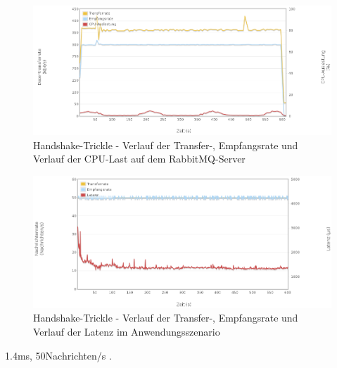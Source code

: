 \documentclass[	a4paper,
			11pt,
			titlepage,
			oneside,
			fleqn,
			listof=totoc,
			parskip,
			numbers=noenddot]{scrartcl}
\begin{document}
		\begin{figure}[!htb]
			\centering
			\includegraphics[width=\textwidth]{img/handshake/handshake_server2.png}
			\caption{Handshake-Trickle - Verlauf der Transfer-, Empfangsrate und Verlauf der CPU-Last auf dem RabbitMQ-Server}
			\label{fig:handshake-server2}
		\end{figure}
		
		\begin{figure}[!htb]
			\centering
			\includegraphics[width=\textwidth]{img/handshake/handshake_scenario.png}
			\caption{Handshake-Trickle - Verlauf der Transfer-, Empfangsrate und Verlauf der Latenz im Anwendungsszenario}
			\label{fig:handshake-scenario}
		\end{figure}
	
	
	\clearpage
		{%
		  \newline
		  \newline
		  \newline
		}{%
		 1.4ms, 50Nachrichten/s
		}{%
		. 
		}
		
\end{document}
